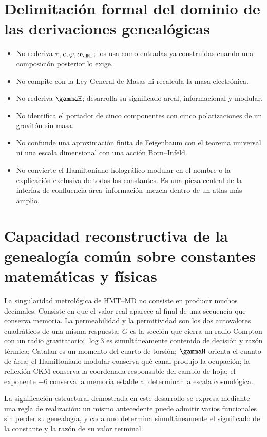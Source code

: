 \section{Delimitación formal del dominio de las derivaciones genealógicas}

\begin{itemize}
\item No rederiva \(\pi,e,\varphi,\alpha_{\HMT}\); los usa como entradas ya
construidas cuando una composici\'on posterior lo exige.
\item No compite con la Ley General de Masas ni recalcula la masa electr\'onica.
\item No rederiva \(\gammaH\); desarrolla su significado areal,
informacional y modular.
\item No identifica el portador de cinco componentes con cinco polarizaciones
de un gravit\'on sin masa.
\item No confunde una aproximaci\'on finita de Feigenbaum con el teorema
universal ni una escala dimensional con una acci\'on Born--Infeld.
\item No convierte el Hamiltoniano hologr\'afico modular en el nombre o la
explicaci\'on exclusiva de todas las constantes. Es una pieza central de la
interfaz de confluencia \'area--informaci\'on--mezcla dentro de un atlas m\'as amplio.
\end{itemize}

\section{Capacidad reconstructiva de la genealogía común sobre constantes matemáticas y físicas}

La singularidad metrol\'ogica de HMT--MD no consiste en producir muchos
decimales. Consiste en que el valor real aparece al final de una secuencia que
conserva memoria. La permeabilidad y la permitividad son los dos autovalores
cuadr\'aticos de una misma respuesta; \(G\) es la secci\'on que cierra un radio
Compton con un radio gravitatorio; \(\log3\) es simult\'aneamente contenido de
decisi\'on y raz\'on t\'ermica; Catalan es un momento del cuarto de torsi\'on;
\(\gammaH\) orienta el cuanto de \'area; el Hamiltoniano modular conserva qu\'e
canal produjo la ocupaci\'on; la reflexi\'on CKM conserva la coordenada
responsable del cambio de hoja; el
exponente \(-6\) conserva la memoria estable al determinar la escala
cosmol\'ogica.

\begin{proposition}
La significaci\'on estructural demostrada en este desarrollo se expresa
mediante una regla de realizaci\'on: un mismo antecedente puede admitir
varios funcionales sin perder su genealog\'ia, y cada uno determina
simult\'aneamente el significado de la constante y la raz\'on de su valor
terminal.
\end{proposition}

